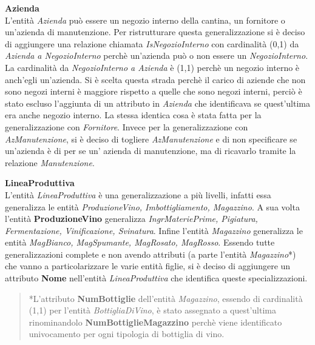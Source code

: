 \begin{flushleft}
	\textbf{\large{Azienda}}\\
	L'entità \emph{Azienda} può essere un negozio interno della cantina, un fornitore o un'azienda di manutenzione. Per ristrutturare questa generalizzazione si è deciso di aggiungere una relazione chiamata \emph{IsNegozioInterno} con cardinalità (0,1) da \emph{Azienda a NegozioInterno} perchè un'azienda può o non essere un \emph{NegozioInterno}. La cardinalità da \emph{NegozioInterno a Azienda} è (1,1) perchè un negozio interno è anch'egli un'azienda. Si è scelta questa strada perchè il carico di aziende che non sono negozi interni è maggiore rispetto a quelle che sono negozi interni, perciò è stato escluso l'aggiunta di un attributo in \emph{Azienda} che identificava se quest'ultima era anche negozio interno. La stessa identica cosa è stata fatta per la generalizzazione con \emph{Fornitore}. Invece per la generalizzazione con \emph{AzManutenzione}, si è deciso di togliere \emph{AzManutenzione} e di non specificare se un'azienda è di per se un' azienda di manutenzione, ma di ricavarlo tramite la relazione \emph{Manutenzione}.
\end{flushleft}

\begin{flushleft}
	\textbf{\large{LineaProduttiva}}\\
	L'entità \emph{LineaProduttiva} è una generalizzazione a più livelli, infatti essa generalizza le entità \emph{ProduzioneVino, Imbottigliamento, Magazzino}. A sua volta l'entità \textbf{ProduzioneVino} generalizza \emph{IngrMateriePrime, Pigiatura, Fermentazione, Vinificazione, Svinatura}. Infine l'entità \emph{Magazzino} generalizza le entità \emph{MagBianco, MagSpumante, MagRosato, MagRosso}. Essendo tutte generalizzazioni complete e non avendo attributi (a parte l'entità \emph{Magazzino}*) che vanno a particolarizzare le varie entità figlie, si è deciso di aggiungere un attributo \textbf{Nome} nell'entità \emph{LineaProduttiva} che identifica queste specializzazioni.
\end{flushleft}

\begin{verse}
	*L'attributo \textbf{NumBottiglie} dell'entità \emph{Magazzino}, essendo di cardinalità (1,1) per l'entità \emph{BottigliaDiVino}, è stato assegnato a quest'ultima rinominandolo \textbf{NumBottiglieMagazzino} perchè viene identificato univocamento per ogni tipologia di bottiglia di vino.
\end{verse}